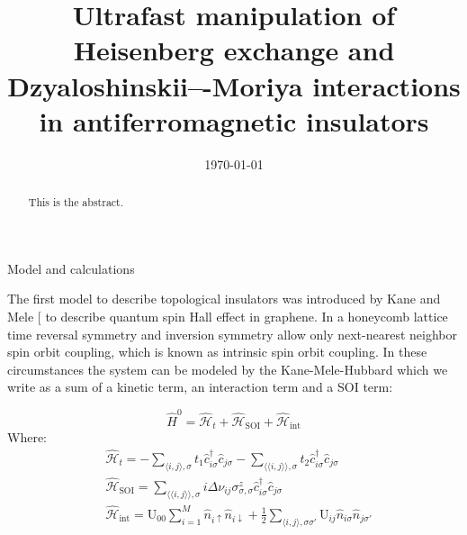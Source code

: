 \documentclass[aps,prl,twocolumn,amsmath,amssymb,superscriptaddress,nobibnotes]{revtex4-1}%
\renewcommand{\cite}[1]{{[}\onlinecite{#1}{]}}
\begin{document}
\title{Ultrafast manipulation of Heisenberg exchange and Dzyaloshinskii–-Moriya interactions in antiferromagnetic insulators}


\begin{abstract}
This is the abstract.
\end{abstract}

\date{\today}
\maketitle

\begin{section}{Model and calculations}

The first model to describe topological insulators was introduced by Kane and Mele \cite{Kane2005} to describe quantum spin Hall effect in graphene. In a honeycomb lattice time reversal symmetry and inversion symmetry allow only next-nearest neighbor spin orbit coupling, which is known as intrinsic spin orbit coupling. In these circumstances the system can be modeled by the Kane-Mele-Hubbard which we write as a sum of a kinetic term, an interaction term and a SOI term:

\begin{equation}
\label{MKMH}
\hat{H}^0 = \hat{\mathcal{H}}_t + \hat{\mathcal{H}}_{\text{SOI}} + \hat{\mathcal{H}}_{\text{int}}
\end{equation}
Where:
\begin{align}
&\hat{\mathcal{H}}_t = - \sum_{\langle i,j \rangle, \sigma} t_1\hat{c}_{i \sigma}^\dagger \hat{c}_{j \sigma} - \sum_{\langle \langle i,j \rangle \rangle, \sigma} t_2\hat{c}_{i \sigma}^\dagger \hat{c}_{j \sigma} \label{Ht} \\
&\hat{\mathcal{H}}_{\text{SOI}} = \sum_{\langle \langle i,j \rangle \rangle, \sigma} i\Delta\nu_{ij}\sigma^z_{\sigma, \sigma}\hat{c}_{i \sigma}^\dagger \hat{c}_{j \sigma} \label{Hsoi} \\
&\hat{\mathcal{H}}_{\text{int}} = \text{U}_{00}\sum_{i=1}^M \hat{n}_{i\uparrow}\hat{n}_{i\downarrow} + \frac{1}{2}\sum_{\langle i,j \rangle, \sigma \sigma'} \text{U}_{ij}\hat{n}_{i\sigma}\hat{n}_{j\sigma'} \label{Hint}
\end{align}


\end{section}
\end{document}
